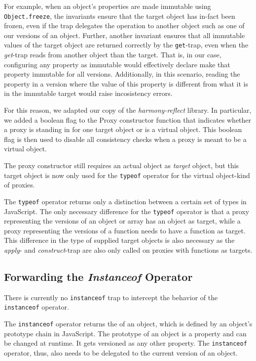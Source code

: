 For example, when an object's properties are made immutable using \lstinline{Object.freeze}, the invariants ensure that the target object has in-fact been frozen, even if the trap delegates the operation to another object such as one of our versions of an object.
Further, another invariant ensures that all immutable values of the target object are returned correctly by the \lstinline{get}-trap, even when the \emph{get}-trap reads from another object than the target. 
That is, in our case, configuring any property as immutable would effectively declare make that property immutable for all versions.
Additionally, in this scenario, reading the property in a version where the value of this property is different from what it is in the immutable target would raise incosistency errors.

For this reason, we adapted our copy of the \emph{harmony-reflect} library.
In particular, we added a boolean flag to the Proxy constructor function that indicates whether a proxy is standing in for one target object or is a virtual object.
This boolean flag is then used to disable all consistency checks when a proxy is meant to be a virtual object.

The proxy constructor still requires an actual object as \emph{target} object, but this target object is now only used for the \lstinline{typeof} operator for the virtual object-kind of proxies.

The \lstinline{typeof} operator returns only a distinction between a certain set of types in JavaScript.
The only necessary difference for the \lstinline{typeof} operator is that a proxy representing the versions of an object or array has an object as target, while a proxy representing the versions of a function needs to have a function as target.
This difference in the type of supplied target objects is also necessary as the \emph{apply}- and \emph{construct}-trap are also only called on proxies with functions as targets.


\subsection{Forwarding the \emph{Instanceof} Operator}

There is currently no \lstinline{instanceof} trap to intercept the behavior of the \lstinline{instanceof} operator.

The \lstinline{instanceof} operator returns the of an object, which is defined by an object's prototype chain in JavaScript.
The prototype of an object is a property and can be changed at runtime.
It gets versioned as any other property.
The \lstinline{instanceof} operator, thus, also needs to be delegated to the current version of an object.

